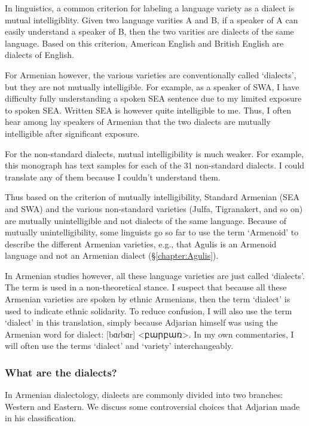 In linguistics, a common criterion for labeling a language variety as a dialect is mutual intelligiblity. Given two language varities A and B, if a speaker of A can easily understand a speaker of B, then the two varities are dialects of the same language. Based on this criterion, American English and British English are dialects of English. 

For Armenian however, the various varieties are conventionally called `dialects', but they are not mutually intelligible. For example, as a speaker of SWA, I have difficulty fully understanding a spoken SEA sentence due to my limited exposure to spoken SEA. Written SEA is however quite intelligible to me. Thus, I often hear among lay speakers of Armenian that the two dialects are mutually intelligible after significant exposure. 

For the non-standard dialects, mutual intelligibility is much weaker. For example, this monograph has text samples for each of the 31 non-standard dialects. I could translate any of them because I couldn't understand them. 


Thus based on the criterion of mutually intelligibility, Standard Armenian (SEA and SWA) and the various non-standard varieties (Julfa, Tigranakert, and so on) are mutually unintelligible and not  dialects of the same language. Because of mutually unintelligibility, some linguists go so far to use the term `Armenoid' to describe the different Armenian varieties, e.g., that Agulis is an Armenoid language \citep{Vaux-2008-ArmenianZok} and not an Armenian dialect (\S\ref{chapter:Agulis}). 

In Armenian studies however, all these language varieties are just called `dialects'. The term is used in a non-theoretical stance. I suspect that  because      all these Armenian varieties are spoken by ethnic Armenians, then the term `dialect' is used to indicate ethnic solidarity. To reduce confusion, I will also use the term `dialect' in this translation, simply because Adjarian himself was using the Armenian word for dialect: [bɑɾbɑr] <բարբառ>. In my own commentaries, I will often use the terms `dialect' and `variety' interchangeably. 





\subsubsection{What are the dialects?}

In Armenian dialectology, dialects are commonly divided into two branches: Western and Eastern. We   discuss some controversial choices that Adjarian made in his classification. 



